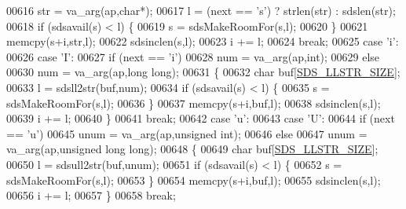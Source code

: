 \begin{DoxyCode}
{{{{{{{{{{{00616                 str = va\_arg(ap,\textcolor{keywordtype}{char}*);
00617                 l = (next == \textcolor{stringliteral}{'s'}) ? strlen(str) : sdslen(str);
00618                 \textcolor{keywordflow}{if} (sdsavail(s) < l) \{
00619                     s = sdsMakeRoomFor(s,l);
00620                 \}
00621                 memcpy(s+i,str,l);
00622                 sdsinclen(s,l);
00623                 i += l;
00624                 \textcolor{keywordflow}{break};
00625             \textcolor{keywordflow}{case} \textcolor{stringliteral}{'i'}:
00626             \textcolor{keywordflow}{case} \textcolor{stringliteral}{'I'}:
00627                 \textcolor{keywordflow}{if} (next == \textcolor{stringliteral}{'i'})
00628                     num = va\_arg(ap,\textcolor{keywordtype}{int});
00629                 \textcolor{keywordflow}{else}
00630                     num = va\_arg(ap,\textcolor{keywordtype}{long} \textcolor{keywordtype}{long});
00631                 \{
00632                     \textcolor{keywordtype}{char} buf[\hyperlink{sds_8c_a81d5c6a677fb9cb9b5fb37fba6a2612d}{SDS\_LLSTR\_SIZE}];
00633                     l = sdsll2str(buf,num);
00634                     \textcolor{keywordflow}{if} (sdsavail(s) < l) \{
00635                         s = sdsMakeRoomFor(s,l);
00636                     \}
00637                     memcpy(s+i,buf,l);
00638                     sdsinclen(s,l);
00639                     i += l;
00640                 \}
00641                 \textcolor{keywordflow}{break};
00642             \textcolor{keywordflow}{case} \textcolor{stringliteral}{'u'}:
00643             \textcolor{keywordflow}{case} \textcolor{stringliteral}{'U'}:
00644                 \textcolor{keywordflow}{if} (next == \textcolor{stringliteral}{'u'})
00645                     unum = va\_arg(ap,\textcolor{keywordtype}{unsigned} \textcolor{keywordtype}{int});
00646                 \textcolor{keywordflow}{else}
00647                     unum = va\_arg(ap,\textcolor{keywordtype}{unsigned} \textcolor{keywordtype}{long} \textcolor{keywordtype}{long});
00648                 \{
00649                     \textcolor{keywordtype}{char} buf[\hyperlink{sds_8c_a81d5c6a677fb9cb9b5fb37fba6a2612d}{SDS\_LLSTR\_SIZE}];
00650                     l = sdsull2str(buf,unum);
00651                     \textcolor{keywordflow}{if} (sdsavail(s) < l) \{
00652                         s = sdsMakeRoomFor(s,l);
00653                     \}
00654                     memcpy(s+i,buf,l);
00655                     sdsinclen(s,l);
00656                     i += l;
00657                 \}
00658                 \textcolor{keywordflow}{break};
}}}}}}}}}}}
\end{DoxyCode}
